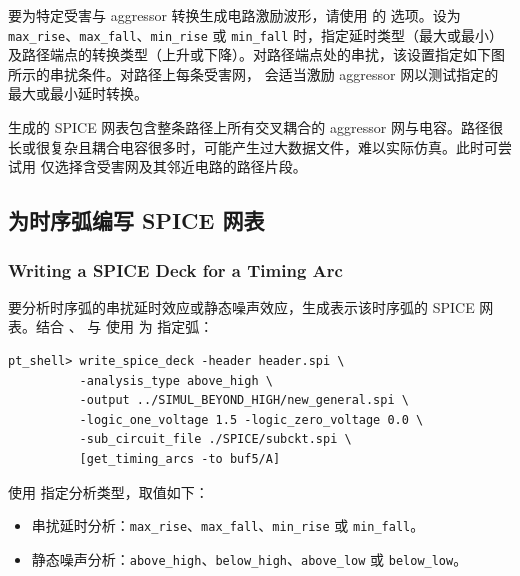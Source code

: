 要为特定受害与 aggressor 转换生成电路激励波形，请使用  的  选项。设为 \texttt{max\_rise}、\texttt{max\_fall}、\texttt{min\_rise} 或 \texttt{min\_fall} 时，指定延时类型（最大或最小）及路径端点的转换类型（上升或下降）。对路径端点处的串扰，该设置指定如下图所示的串扰条件。对路径上每条受害网， 会适当激励 aggressor 网以测试指定的最大或最小延时转换。


生成的 SPICE 网表包含整条路径上所有交叉耦合的 aggressor 网与电容。路径很长或很复杂且耦合电容很多时，可能产生过大数据文件，难以实际仿真。此时可尝试用  仅选择含受害网及其邻近电路的路径片段。

\subsection{为时序弧编写 SPICE 网表}
\subsubsection*{Writing a SPICE Deck for a Timing Arc}

要分析时序弧的串扰延时效应或静态噪声效应，生成表示该时序弧的 SPICE 网表。结合 、 与  使用  为  指定弧：
\begin{lstlisting}
pt_shell> write_spice_deck -header header.spi \
          -analysis_type above_high \
          -output ../SIMUL_BEYOND_HIGH/new_general.spi \
          -logic_one_voltage 1.5 -logic_zero_voltage 0.0 \
          -sub_circuit_file ./SPICE/subckt.spi \
          [get_timing_arcs -to buf5/A]
\end{lstlisting}

使用 \opt{-analysis\_type} 指定分析类型，取值如下：
\begin{itemize}
  \item 串扰延时分析：\texttt{max\_rise}、\texttt{max\_fall}、\texttt{min\_rise} 或 \texttt{min\_fall}。
\end{itemize}


\begin{itemize}
  \item 静态噪声分析：\texttt{above\_high}、\texttt{below\_high}、\texttt{above\_low} 或 \texttt{below\_low}。
\end{itemize}

